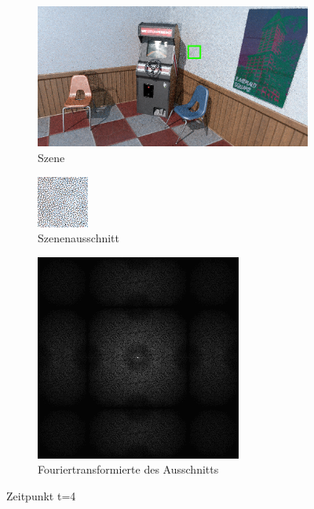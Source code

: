 \begin{figure}[H]
    \begin{subfigure}{\textwidth}  
        \centering \includegraphics[scale=.25]{content/TemporalerAlg/Bilder/Sorting/Szene/Szene4.png}
        \caption{Szene}
        \label{fig:Nur_Sorting_Szene_t4}
    \end{subfigure}
    \begin{subfigure}{0.5\textwidth}
        \centering\includegraphics[width=0.4\linewidth]{content/TemporalerAlg/Bilder/Sorting/Ausschnitte/Ausschnitt4.png} 
        \caption{Szenenausschnitt}
        \label{fig:Nur_Sorting_ausschnitt_t4}
    \end{subfigure}
    \begin{subfigure}{0.5\textwidth}
        \centering\includegraphics[width=0.4\linewidth]{content/TemporalerAlg/Bilder/Sorting//Spektren/Ausschnitt4.png}
        \caption{Fouriertransformierte des Ausschnitts}
        \label{fig:Nur_Sorting_Fouriertransformierte_t4}
    \end{subfigure}
        \caption{Zeitpunkt t=4}
        \label{fig:Nur_Sorting_Verlauf_t4}
\end{figure}


